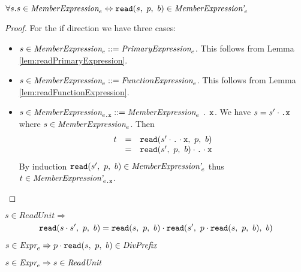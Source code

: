 \documentclass[preprint,10pt]{sigplanconf}
\begin{document}
\begin{lemma}\mbox{}

  \( \forall s. s \in \textit{MemberExpression}_{e} \Leftrightarrow 
  \texttt{read}(s,~p,~b) \in \textit{MemberExpression'}_{e} \)
\end{lemma}
\begin{proof}
  For the if direction we have three cases:
  \begin{itemize}
  \item \( s \in \textit{MemberExpression}_{e} ::=
    \textit{PrimaryExpression}_{e} \). This follows from Lemma
    \ref{lem:readPrimaryExpression}.
    
  \item \( s \in \textit{MemberExpression}_{e} ::=
    \textit{FunctionExpression}_{e} \). This follows from Lemma
    \ref{lem:readFunctionExpression}.
    
  \item \( s \in \textit{MemberExpression}_{e\texttt{.\texttt{x}}} ::=
    \textit{MemberExpression}_{e} ~\texttt{.}~\texttt{x} \). We have 
    \( s = s' \cdot \texttt{.} \texttt{x} \) where \( s \in
    \textit{MemberExpression}_{e} \). Then
    \[
    \begin{array}{rcl}
      t &=& \texttt{read}(s' \cdot \texttt{.} \cdot \texttt{x},~p,~b)
      \\
      &=& \texttt{read}(s',~p,~b) \cdot \texttt{.} \cdot \texttt{x}
    \end{array}
    \]
    By induction \( \texttt{read}(s',~p,~b) \in \textit{MemberExpression'}_{e}
    \) thus \( t \in \textit{MemberExpression'}_{e\texttt{.\texttt{x}}} \).
  \end{itemize}
\end{proof}


\begin{lemma}\mbox{}

  \( s \in \textit{ReadUnit} \Rightarrow \)
\[
  \texttt{read}(s\cdot s',~p,~b) = 
  \texttt{read}(s,~p,~b) \cdot \texttt{read}(s',~p \cdot \texttt{read}(s,~p,~b),~b)
\] 
\end{lemma}

\begin{lemma}\mbox{}

  \( s \in \textit{Expr}_{e} \Rightarrow p \cdot \texttt{read}(s,~p,~b) \in \textit{DivPrefix} \)
\end{lemma}

\begin{lemma}
  \( s \in \textit{Expr}_{e} \Rightarrow s \in \textit{ReadUnit} \)
\end{lemma}
\end{document}
